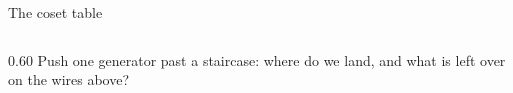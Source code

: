 \begin{frame}{The coset table  \InPaper}
\begin{columns}[c]
\begin{column}{0.60\textwidth}
Push one generator past a staircase: where do we land, and what is left
over on the wires above?
\begin{code}%
\>[0]\AgdaSpace{}%
\AgdaSymbol{:}\AgdaSpace{}%
\AgdaSpace{}%
\AgdaSymbol{(}\AgdaSpace{}%
\AgdaSymbol{)}\AgdaSpace{}%
\AgdaSpace{}%
\AgdaSpace{}%
\AgdaSymbol{(}\AgdaSpace{}%
\AgdaSymbol{)}\AgdaSpace{}%
\AgdaSpace{}%
\AgdaSpace{}%
\AgdaSymbol{(}\AgdaSpace{}%
\AgdaSymbol{)}\AgdaSpace{}%
\AgdaSpace{}%
\AgdaSpace{}%
\AgdaSymbol{(}\AgdaSpace{}%
\AgdaSymbol{)}\<%
\\
\>[0]\AgdaSpace{}%
\AgdaSpace{}%
\AgdaSpace{}%
\AgdaSymbol{=}\AgdaSpace{}%
\AgdaSpace{}%
\AgdaOperator{\AgdaInductiveConstructor{,}}\AgdaSpace{}%
\AgdaSpace{}%
%
\>[36]\<%
\\
\>[0]\AgdaSpace{}%
\AgdaSymbol{(}\AgdaSpace{}%
\AgdaSymbol{)}\AgdaSpace{}%
\AgdaSpace{}%
\AgdaSymbol{=}\AgdaSpace{}%
\AgdaSpace{}%
\AgdaOperator{\AgdaInductiveConstructor{,}}\AgdaSpace{}%
%
\>[36]\<%
\\
\>[0]\AgdaSpace{}%
\AgdaSymbol{(}\AgdaSpace{}%
\AgdaSpace{}%
\AgdaSymbol{)}\AgdaSpace{}%
\AgdaSpace{}%
\AgdaSymbol{=}\AgdaSpace{}%
\AgdaSpace{}%
\AgdaOperator{\AgdaInductiveConstructor{,}}\AgdaSpace{}%
\AgdaSpace{}%
\AgdaSpace{}%
%
\>[36]\<%
\\
\>[0]\AgdaSpace{}%

\end{code}
\end{column}
\end{columns}
\end{frame}
